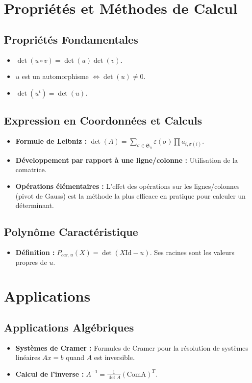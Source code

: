 \documentclass[12pt, a4paper, parskip=full]{report}
\theoremstyle{agregstyle}
\begin{document}
\section{Propriétés et Méthodes de Calcul}
\subsection{Propriétés Fondamentales}
\begin{itemize}
    \item $\det(u \circ v) = \det(u)\det(v)$.
    \item $u$ est un automorphisme $\iff \det(u) \neq 0$.
    \item $\det(u^t) = \det(u)$.
\end{itemize}
\subsection{Expression en Coordonnées et Calculs}
\begin{itemize}
    \item \textbf{Formule de Leibniz :} $\det(A) = \sum_{\sigma \in \mathfrak{S}_n} \varepsilon(\sigma) \prod a_{i, \sigma(i)}$.
    \item \textbf{Développement par rapport à une ligne/colonne :} Utilisation de la comatrice.
    \item \textbf{Opérations élémentaires :} L'effet des opérations sur les lignes/colonnes (pivot de Gauss) est la méthode la plus efficace en pratique pour calculer un déterminant.
\end{itemize}
\subsection{Polynôme Caractéristique}
\begin{itemize}
    \item \textbf{Définition :} $P_{car,u}(X) = \det(X \mathrm{Id} - u)$. Ses racines sont les valeurs propres de $u$.
\end{itemize}

\section{Applications}
\subsection{Applications Algébriques}
\begin{itemize}
    \item \textbf{Systèmes de Cramer :} Formules de Cramer pour la résolution de systèmes linéaires $Ax=b$ quand $A$ est inversible.
    \item \textbf{Calcul de l'inverse :} $A^{-1} = \frac{1}{\det A} (\mathrm{Com A})^T$.
\end{itemize}
\end{document}
